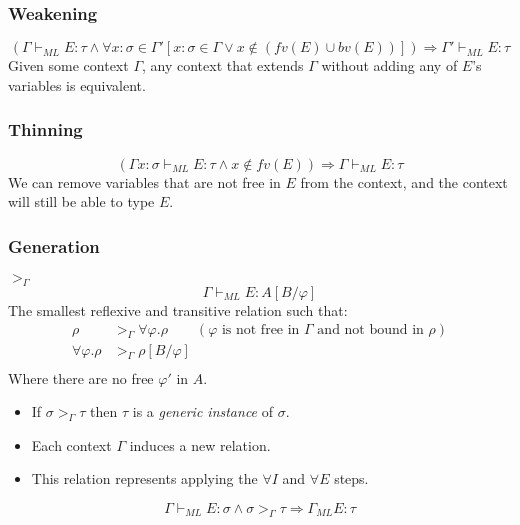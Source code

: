 \subsubsection{Weakening}
\[(\Gamma \vdash_{ML} E : \tau \land \forall x:\sigma \in \Gamma' [x:\sigma \in \Gamma \lor x \not\in (fv(E) \cup bv(E)) ]) \Rightarrow \Gamma' \vdash_{ML} E : \tau\]
Given some context $\Gamma$, any context that extends $\Gamma$ without adding any of $E$'s variables is equivalent.
\subsubsection{Thinning}
\[(\Gamma x:\sigma \vdash_{ML} E : \tau \land x \not\in fv(E)) \Rightarrow \Gamma \vdash_{ML} E : \tau \]
We can remove variables that are not free in $E$ from the context, and the context will still be able to type $E$.

\subsubsection{Generation}
\begin{definitionbox}{$>_\Gamma$}
    \[\Gamma \vdash_{ML} E : A[B / \varphi]\]
    The smallest reflexive and transitive relation such that:
    \[\begin{split}
        \rho & >_\Gamma \forall \varphi . \rho \qquad (\varphi \text{ is not free in }\Gamma\text{ and not bound in }\rho)\\
        \forall \varphi . \rho & >_\Gamma \rho[B / \varphi] \\
    \end{split}\]
    Where there are no free $\varphi'$ in $A$.
    \begin{itemize}
        \item If $\sigma >_\Gamma \tau$ then $\tau$ is a \textit{generic instance} of $\sigma$.
        \item Each context $\Gamma$ induces a new relation.
        \item This relation represents applying the $\forall I$ and $\forall E$ steps.
    \end{itemize}
    \[\Gamma \vdash_{ML} E : \sigma \land \sigma >_{\Gamma} \tau \Rightarrow \Gamma_{ML} E : \tau\]
\end{definitionbox}

